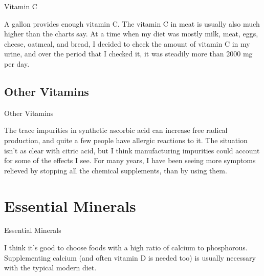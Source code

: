 \documentclass[11pt,oneside,openany,extrafontsizes]{memoir}
\begin{document}
\begin{standalonequote}{Vitamin C}

    \begin{answer}
      A gallon provides enough vitamin C. The vitamin C in meat is usually also much higher than the charts say. At a time when my diet was mostly milk, meat, eggs, cheese, oatmeal, and bread, I decided to check the amount of vitamin C in my urine, and over the period that I checked it, it was steadily more than 2000 mg per day.
    \end{answer}
\end{standalonequote}

\subsection{Other Vitamins}

\begin{standalonequote}{Other Vitamins}

    \begin{answer}
        The trace impurities in synthetic ascorbic acid can increase free radical production, and quite a few people have allergic reactions to it. The situation isn't as clear with citric acid, but I think manufacturing impurities could account for some of the effects I see. For many years, I have been seeing more symptoms relieved by stopping all the chemical supplements, than by using them.
    \end{answer}
\end{standalonequote}

\section{Essential Minerals}

\begin{standalonequote}{Essential Minerals}

    \begin{answer}
        I think it's good to choose foods with a high ratio of calcium to phosphorous. Supplementing calcium (and often vitamin D is needed too) is usually necessary with the typical modern diet.
    \end{answer}
\end{standalonequote}
\end{document}
